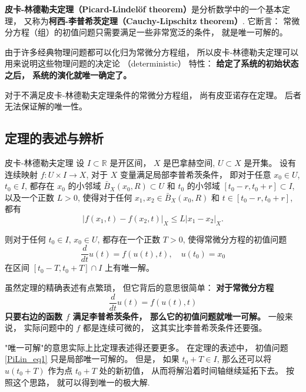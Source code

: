 
\textbf{皮卡-林德勒夫定理（Picard-Lindelöf theorem）}是分析数学中的一个基本定理， 又称为\textbf{柯西-李普希茨定理（Cauchy-Lipschitz theorem）}. 它断言： 常微分方程（组）的初值问题只需要满足一些非常宽泛的条件， 就是唯一可解的。 

由于许多经典物理问题都可以化归为常微分方程组， 所以皮卡-林德勒夫定理可以用来说明这些物理问题的决定论 （deterministic） 特性： \textbf{给定了系统的初始状态之后， 系统的演化就唯一确定了。}

对于不满足皮卡-林德勒夫定理条件的常微分方程组， 尚有皮亚诺存在定理。 后者无法保证解的唯一性。

\subsection{定理的表述与辨析}
\begin{theorem}{皮卡-林德勒夫定理}
设 $I\subset\mathbb{R}$ 是开区间， $X$ 是巴拿赫空间, $U\subset X$ 是开集。 设有连续映射 $f:U\times I\to X$, 对于 $X$ 变量满足局部李普希茨条件， 即对于任意 $x_0\in U$, $t_0\in I$, 都存在 $x_0$ 的小邻域 $\bar B_X(x_0,R)\subset U$ 和 $t_0$ 的小邻域 $[t_0-r,t_0+r]\subset I$, 以及一个正数 $L>0$, 使得对于任何 $x_1,x_2\in \bar B_X(x_0,R)$ 和 $t\in[t_0-r,t_0+r]$, 都有
$$
|f(x_1,t)-f(x_2,t)|_X\leq L|x_1-x_2|_X.
$$

则对于任何 $t_0\in I$, $x_0\in U$, 都存在一个正数 $T>0$, 使得常微分方程的初值问题
$$
\frac{d}{dt}u(t)=f(u(t),t),\quad u(t_0)=x_0
$$
在区间 $[t_0-T,t_0+T]\cap I$ 上有唯一解。
\end{theorem}

虽然定理的精确表述有点繁琐， 但它背后的意思很简单： \textbf{对于常微分方程}
\begin{equation}\label{PiLin_eq1}
\frac{d}{dt}u(t)=f(u(t),t)
\end{equation}
\textbf{只要右边的函数 $f$ 满足李普希茨条件， 那么它的初值问题就唯一可解。} 一般来说， 实际问题中的 $f$ 都是连续可微的， 这其实比李普希茨条件还要强。

"唯一可解"的意思实际上比定理表述得还要更多。 在定理的表述中， 初值问题 \autoref{PiLin_eq1} 只是局部唯一可解的。 但是， 如果 $t_0+T\in I$, 那么还可以将 $u(t_0+T)$ 作为点 $t_0+T$ 处的新初值， 从而将解沿着时间轴继续延拓下去。 按照这个思路， 就可以得到唯一的极大解.

